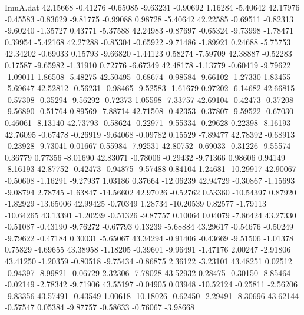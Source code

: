 \begin{filecontents}{ImuA.dat}
  42.15668   -0.41276   -0.65085   -9.63231   -0.90692    1.16284   -5.40642
  42.17976   -0.45583   -0.83629   -9.81775   -0.99088    0.98728   -5.40642
  42.22585   -0.69511   -0.82313   -9.60240   -1.35727    0.43771   -5.37588
  42.24983   -0.87697   -0.65324   -9.73998   -1.78471    0.39954   -5.42168
  42.27288   -0.85304   -0.65922   -9.71486   -1.89921    0.24688   -5.75753
  42.34202   -0.69033    0.15793   -9.66820   -1.44123    0.58274   -7.59709
  42.38887   -0.52283    0.17587   -9.65982   -1.31910    0.72776   -6.67349
  42.48178   -1.13779   -0.60419   -9.79622   -1.09011    1.86508   -5.48275
  42.50495   -0.68674   -0.98584   -9.66102   -1.27330    1.83455   -5.69647
  42.52812   -0.56231   -0.98465   -9.52583   -1.61679    0.97202   -6.14682
  42.66815   -0.57308   -0.35294   -9.56292   -0.72373    1.05598   -7.33757
  42.69104   -0.42473   -0.37208   -9.56890   -0.51764    0.89569   -7.88714
  42.71508   -0.42353   -0.37807   -9.59522   -0.67030    0.46061   -8.13140
  42.73793   -0.58624   -0.22971   -9.55334   -0.29628    0.22398   -8.16193
  42.76095   -0.67478   -0.26919   -9.64068   -0.09782    0.15529   -7.89477
  42.78392   -0.68913   -0.23928   -9.73041    0.01667    0.55984   -7.92531
  42.80752   -0.69033   -0.31226   -9.55574    0.36779    0.77356   -8.01690
  42.83071   -0.78006   -0.29432   -9.71366    0.98606    0.94149   -8.16193
  42.87752   -0.42473   -0.94875   -9.57488    0.84104    1.24681  -10.29917
  42.90067   -0.50608   -1.16291   -9.27937    1.03186    0.37664  -12.06239
  42.94729   -0.30867   -1.15693   -9.08794    2.78745   -1.63847  -14.56602
  42.97026   -0.52762    0.53360  -10.54397    0.87920   -1.82929  -13.65006
  42.99425   -0.70349    1.28734  -10.20539    0.82577   -1.79113  -10.64265
  43.13391   -1.20239   -0.51326   -9.87757    0.10064    0.04079   -7.86424
  43.27330   -0.51087   -0.43190   -9.76272   -0.67793    0.13239   -5.68884
  43.29617   -0.54676   -0.50249   -9.79622   -0.47184    0.30031   -5.65067
  43.34294   -0.91406   -0.43669   -9.51506   -1.01378    0.75829   -4.69655
  43.38958   -1.18205   -0.39601   -9.96491   -1.47176    2.00247   -2.91806
  43.41250   -1.20359   -0.80518   -9.75434   -0.86875    2.36122   -3.23101
  43.48251    0.02512   -0.94397   -8.99821   -0.06729    2.32306   -7.78028
  43.52932    0.28475   -0.30150   -8.85464   -0.02149   -2.78342   -9.71906
  43.55197   -0.04905    0.03948  -10.52124   -0.25811   -2.56206   -9.83356
  43.57491   -0.43549    1.00618  -10.18026   -0.62450   -2.29491   -8.30696
  43.62144   -0.57547    0.05384   -9.87757   -0.58633   -0.76067   -3.98668

\end{filecontents}
